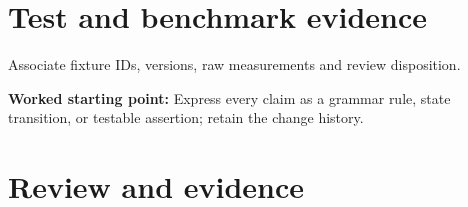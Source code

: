 \documentclass[11pt,letterpaper]{article}
\begin{document}
\section{Test and benchmark evidence}
Associate fixture IDs, versions, raw measurements and review disposition.\par\textbf{Worked starting point:} Express every claim as a grammar rule, state transition, or testable assertion; retain the change history.
\section{Review and evidence}
\end{document}
